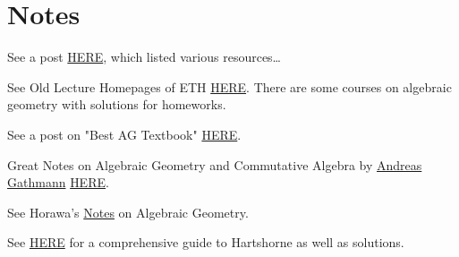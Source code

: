 \section{Notes}

See a post \href{https://math.stackexchange.com/questions/1678780/hartshorne-or-vakils-notes}{HERE}, which listed various resources\dots

See Old Lecture Homepages of ETH \href{https://www2.math.ethz.ch/education/bachelor/lectures.html}{HERE}. There are some courses on algebraic geometry with solutions for homeworks.

See a post on "Best AG Textbook" \href{https://math.stackexchange.com/questions/998/best-algebraic-geometry-text-book-other-than-hartshorne#:~:text=Before%20Hartshorne%27s%20book%20there%20was,and%20the%20sheaf%20of%20differentials.}{HERE}.

Great Notes on Algebraic Geometry and Commutative Algebra by \href{https://math.rptu.de/ags/agag/personen/leitung/gathmann/}{Andreas Gathmann} \href{https://agag-gathmann.math.rptu.de/de/notes.php}{HERE}.

See Horawa's \href{https://people.maths.ox.ac.uk/horawa/notes.html}{Notes} on Algebraic Geometry.

See \href{https://mathbooknotes.fandom.com/wiki/Hartshorne_-_Algebraic_Geometry}{HERE} for a comprehensive guide to Hartshorne as well as solutions.